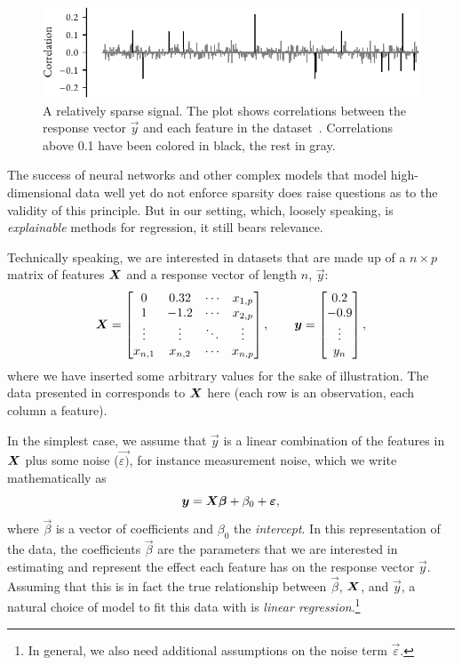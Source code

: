 \begin{figure}[pb]
  \centering
  \includegraphics[]{figures/sparse-signal.pdf}
  \caption{%
    A relatively sparse signal. The plot shows correlations between the response vector \(\vec{y}\) and each feature in the  dataset~\parencite{guyon2004}. Correlations above 0.1 have been colored in black, the rest in gray.
  }
  \label{fig:sparse-signal}
\end{figure}

The success of neural networks and other complex models that model high-dimensional data well yet do not enforce sparsity does raise questions as to the validity of this principle. But in our setting, which, loosely speaking, is \emph{explainable} methods for regression, it still bears relevance.

Technically speaking, we are interested in datasets that are made up of a \(n \times p\) matrix of features \(\boldsymbol{X}\) and a response vector of length \(n\), \(\vec{y}\):
\[
  \boldsymbol{X} = \begin{bmatrix}
    0       & 0.32    & \cdots & x_{1,p} \\
    1       & -1.2    & \cdots & x_{2,p} \\
    \vdots  & \vdots  & \ddots & \vdots  \\
    x_{n,1} & x_{n,2} & \cdots & x_{n,p} \\
  \end{bmatrix},\qquad
  \boldsymbol{y} = \begin{bmatrix}0.2 \\ -0.9 \\ \vdots \\ y_n\end{bmatrix},
\]
where we have inserted some arbitrary values for the sake of illustration. The data presented in  corresponds to \(\boldsymbol{X}\) here (each row is an observation, each column a feature).

In the simplest case, we assume that \(\vec{y}\) is a linear combination of the features in \(\boldsymbol{X}\) plus some noise (\(\vec{\varepsilon)}\), for instance measurement noise, which we write mathematically as
\[
  \boldsymbol{y} = \boldsymbol{X}\boldsymbol{\beta} + \beta_0 + \boldsymbol{\varepsilon},
\]
where \(\vec{\beta}\) is a vector of coefficients and \(\beta_0\) the \emph{intercept}. In this representation of the data, the coefficients \(\vec{\beta}\) are the parameters that we are interested in estimating and represent the effect each feature has on the response vector \(\vec{y}\).
Assuming that this is in fact the true relationship between \(\vec{\beta}\), \(\boldsymbol{X}\), and \(\vec{y}\), a natural choice of model to fit this data with is \emph{linear regression}.\footnote{In general, we also need additional assumptions on the noise term \(\vec{\varepsilon}\).}

